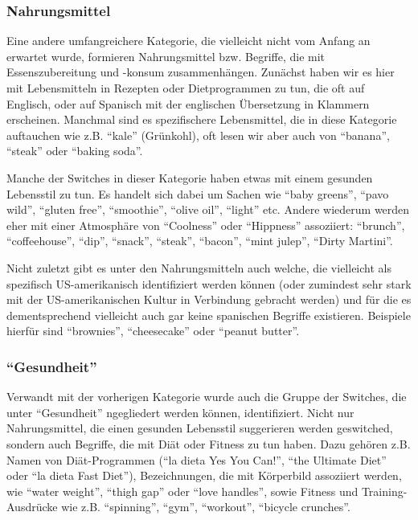 \subsubsection{Nahrungsmittel}
Eine andere umfangreichere Kategorie, die vielleicht nicht vom Anfang an erwartet wurde, formieren Nahrungsmittel bzw. Begriffe, die mit Essenszubereitung und -konsum zusammenhängen.
Zunächst haben wir es hier mit Lebensmitteln in Rezepten oder Dietprogrammen zu tun, die oft auf Englisch, oder auf Spanisch mit der englischen Übersetzung in Klammern erscheinen.
Manchmal sind es spezifischere Lebensmittel, die in diese Kategorie auftauchen wie z.B. ``kale'' (Grünkohl), oft lesen wir aber auch von ``banana'', ``steak'' oder ``baking soda''.

Manche der Switches in dieser Kategorie haben etwas mit einem gesunden Lebensstil zu tun.
Es handelt sich dabei um Sachen wie ``baby greens'', ``pavo wild'', ``gluten free'', ``smoothie'', ``olive oil'', ``light'' etc.
Andere wiederum werden eher mit einer Atmosphäre von ``Coolness'' oder ``Hippness'' assoziiert:
``brunch'', ``coffeehouse'', ``dip'', ``snack'', ``steak'', ``bacon'', ``mint julep'', ``Dirty Martini''.

Nicht zuletzt gibt es unter den Nahrungsmitteln auch welche, die vielleicht als spezifisch US-amerikanisch identifiziert werden können (oder zumindest sehr stark mit der US-amerikanischen Kultur in Verbindung gebracht werden) und für die es dementsprechend vielleicht auch gar keine spanischen Begriffe existieren.
Beispiele hierfür sind ``brownies'', ``cheesecake'' oder ``peanut butter''.

\subsubsection{``Gesundheit''}
Verwandt mit der vorherigen Kategorie wurde auch die Gruppe der Switches, die unter ``Gesundheit''  ngegliedert werden können, identifiziert.
Nicht nur Nahrungsmittel, die einen gesunden Lebensstil suggerieren werden geswitched, sondern auch Begriffe, die mit Diät oder Fitness zu tun haben.
Dazu gehören z.B. Namen von Diät-Programmen (``la dieta Yes You Can!'', ``the Ultimate Diet'' oder ``la dieta Fast Diet''),
Bezeichnungen, die mit Körperbild assoziiert werden, wie ``water weight'', ``thigh gap'' oder ``love handles'',
sowie Fitness und Training-Ausdrücke wie z.B. ``spinning'', ``gym'', ``workout'', ``bicycle crunches''.

